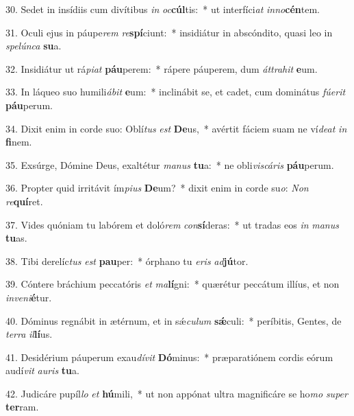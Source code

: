 30. Sedet in insídiis cum divítibus \textit{in} \textit{oc}\textbf{cúl}tis:~*  ut interfíci\textit{at} \textit{in}\textit{no}\textbf{cén}tem.\

31. Oculi ejus in páupe\textit{rem} \textit{re}\textbf{spí}ciunt:~*  insidiátur in abscóndito, quasi leo in \textit{spe}\textit{lún}\textit{ca} \textbf{su}a.\

32. Insidiátur ut rá\textit{pi}\textit{at} \textbf{páu}perem:~*  rápere páuperem, dum \textit{át}\textit{tra}\textit{hit} \textbf{e}um.\

33. In láqueo suo humili\textit{á}\textit{bit} \textbf{e}um:~*  inclinábit se, et cadet, cum dominátus \textit{fú}\textit{e}\textit{rit} \textbf{páu}perum.\

34. Dixit enim in corde suo: Oblí\textit{tus} \textit{est} \textbf{De}us,~*  avértit fáciem suam ne ví\textit{de}\textit{at} \textit{in} \textbf{fi}nem.\

35. Exsúrge, Dómine Deus, exaltétur \textit{ma}\textit{nus} \textbf{tu}a:~*  ne obli\textit{vis}\textit{cá}\textit{ris} \textbf{páu}perum.\

36. Propter quid irritávit ím\textit{pi}\textit{us} \textbf{De}um?~*  dixit enim in corde su\textit{o}: \textit{Non} \textit{re}\textbf{quí}ret.\

37. Vides quóniam tu labórem et doló\textit{rem} \textit{con}\textbf{sí}deras:~*  ut tradas eos \textit{in} \textit{ma}\textit{nus} \textbf{tu}as.\

38. Tibi derelíc\textit{tus} \textit{est} \textbf{pau}per:~*  órphano tu \textit{e}\textit{ris} \textit{ad}\textbf{jú}tor.\

39. Cóntere bráchium peccatóris \textit{et} \textit{ma}\textbf{lí}gni:~*  quærétur peccátum illíus, et non \textit{in}\textit{ve}\textit{ni}\textbf{é}tur.\

40. Dóminus regnábit in ætérnum, et in sǽ\textit{cu}\textit{lum} \textbf{sǽ}culi:~*  períbitis, Gentes, de \textit{ter}\textit{ra} \textit{il}\textbf{lí}us.\

41. Desidérium páuperum exau\textit{dí}\textit{vit} \textbf{Dó}minus:~*  præparatiónem cordis eórum audí\textit{vit} \textit{au}\textit{ris} \textbf{tu}a.\

42. Judicáre pupíl\textit{lo} \textit{et} \textbf{hú}mili,~*  ut non appónat ultra magnificáre se ho\textit{mo} \textit{su}\textit{per} \textbf{ter}ram.\

